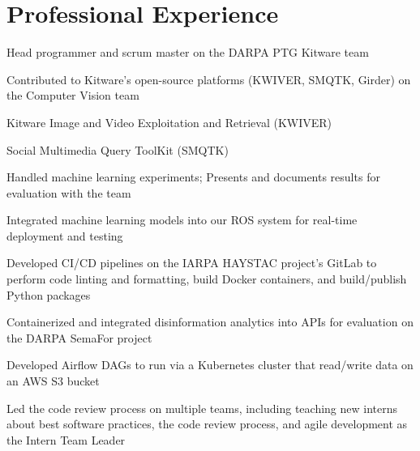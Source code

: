 \documentclass[]{deedy-resume-reversed}
\begin{document}
\begin{minipage}[t]{0.70\textwidth}
\section{Professional Experience}
\vspace{\topsep} %
\begin{tightemize}
\item Head programmer and scrum master on the DARPA PTG Kitware team
\item Contributed to Kitware’s open-source platforms (KWIVER, SMQTK, Girder) on the Computer Vision team
    \vspace{3pt}
    \begin{tightemize}
    \item Kitware Image and Video Exploitation and Retrieval (KWIVER)
    \item Social Multimedia Query ToolKit (SMQTK)
    \end{tightemize}
    \vspace{5pt}
\item Handled machine learning experiments; Presents and documents results for evaluation with the team
\item Integrated machine learning models into our ROS system for real-time deployment and testing
\item Developed CI/CD pipelines on the IARPA HAYSTAC project's GitLab to perform code linting and formatting, build Docker containers, and build/publish Python packages
\item Containerized and integrated disinformation analytics into APIs for evaluation on the DARPA SemaFor project
\item Developed Airflow DAGs to run via a Kubernetes cluster that read/write data on an AWS S3 bucket
\item Led the code review process on multiple teams, including teaching new interns about best software practices, the code review process, and agile development as the Intern Team Leader
\end{tightemize}
\sectionsep


\end{minipage}
\end{document}
